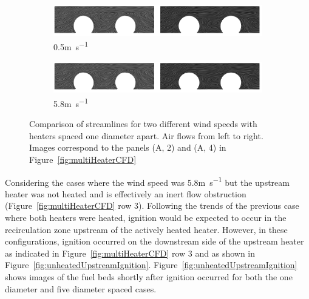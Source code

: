        \begin{figure}[hbpt]
            \centering
             \begin{subfigure}[b]{0.49\textwidth}
                \centering
                \includegraphics[width=\textwidth, trim={27cm 0 0 0},clip]{Figures/recirculationComparison.png}
                \caption{0.5\si{\meter\per\second}}
                \label{subfig:comparisonLowWind}
            \end{subfigure}
            \begin{subfigure}[b]{0.49\textwidth}
                \centering
                \includegraphics[width=\textwidth, trim={0 0 27cm 0},clip]{Figures/recirculationComparison.png}
                \caption{5.8\si{\meter\per\second}}
                \label{subfig:comparisonHighWind}
            \end{subfigure}
            \caption{Comparison of streamlines for two different wind speeds with heaters spaced one diameter apart. Air flows from left to right. Images correspond to the panels (A, 2) and (A, 4) in Figure~\ref{fig:multiHeaterCFD}}
            \label{fig:streamlineComparison}
        \end{figure}
    Considering the cases where the wind speed was 5.8\si{\meter\per\second} but the upstream heater was not heated and is effectively an inert flow obstruction (Figure~\ref{fig:multiHeaterCFD} row 3). Following the trends of the previous case where both heaters were heated, ignition would be expected to occur in the recirculation zone upstream of the actively heated heater. However, in these configurations, ignition occurred on the downstream side of the upstream heater as indicated in Figure~\ref{fig:multiHeaterCFD} row 3 and as shown in Figure~\ref{fig:unheatedUpstreamIgnition}. Figure~\ref{fig:unheatedUpstreamIgnition} shows images of the fuel beds shortly after ignition occurred for both the one diameter and five diameter spaced cases. 
